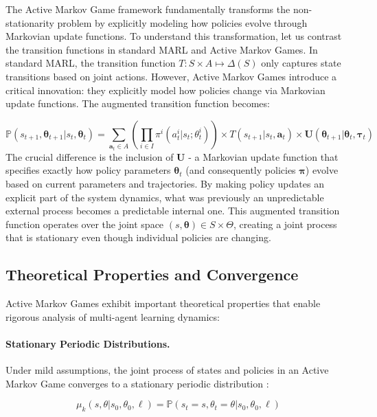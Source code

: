 The Active Markov Game framework fundamentally transforms the non-stationarity problem by explicitly modeling how policies evolve through Markovian update functions. To understand this transformation, let us contrast the transition functions in standard MARL and Active Markov Games. In standard MARL, the transition function $T: S \times A \mapsto \Delta(S)$ only captures state transitions based on joint actions. However, Active Markov Games introduce a critical innovation: they explicitly model how policies change via Markovian update functions. The augmented transition function becomes:

\begin{equation}
    \mathbb{P}(s_{t+1}, \boldsymbol{\theta}_{t+1}|s_t, \boldsymbol{\theta}_t) = \sum_{\mathbf{a}_t \in A} \left(\prod_{i \in I} \pi^i(a^i_t|s_t; \theta^i_t)\right) \times T(s_{t+1}|s_t, \mathbf{a}_t) \times \boldsymbol{U}(\boldsymbol{\theta}_{t+1}|\boldsymbol{\theta}_t, \boldsymbol{\tau}_t)
\end{equation}
The crucial difference is the inclusion of $\boldsymbol{U}$ - a Markovian update function that specifies exactly how policy parameters $\boldsymbol{\theta}_t$ (and consequently policies $\boldsymbol{\pi}$) evolve based on current parameters and trajectories. By making policy updates an explicit part of the system dynamics, what was previously an unpredictable external process becomes a predictable internal one. This augmented transition function operates over the joint space $(s, \boldsymbol{\theta}) \in S \times \Theta$, creating a joint process that is stationary even though individual policies are changing.


\subsection{Theoretical Properties and Convergence}

Active Markov Games exhibit important theoretical properties that enable rigorous analysis of multi-agent learning dynamics:

\paragraph{Stationary Periodic Distributions.} Under mild assumptions, the joint process of states and policies in an Active Markov Game converges to a stationary periodic distribution \cite{kim2022influencing}:

\begin{equation}
    \mu_k(s, \theta|s_0, \theta_0, \ell) = \mathbb{P}(s_t = s, \theta_t = \theta|s_0, \theta_0, \ell)
\end{equation}

